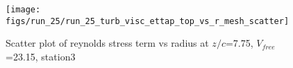 \begin{figure}[H]
\centering
\texttt{[image: figs/run\_25/run\_25\_turb\_visc\_ettap\_top\_vs\_r\_mesh\_scatter]}
\caption{Scatter plot of reynolds stress term vs radius at $z/c$=7.75, $V_{free}$=23.15, station3}
\label{fig:run_25_turb_visc_ettap_top_vs_r_mesh_scatter}
\end{figure}


